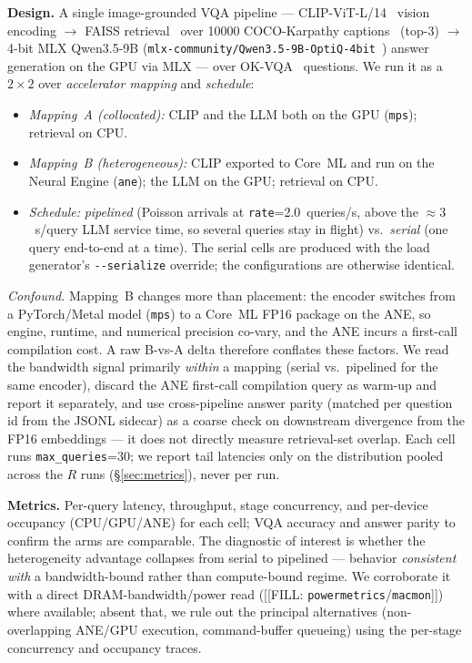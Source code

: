 \textbf{Design.} A single image-grounded VQA pipeline ---
CLIP-ViT-L/14~\cite{radford2021clip} vision encoding $\rightarrow$ FAISS
retrieval~\cite{johnson2019faiss} over \num{10000} COCO-Karpathy
captions~\cite{lin2014coco,karpathy2015deepvs} (top-3) $\rightarrow$ 4-bit MLX
Qwen3.5-9B (\texttt{mlx-community/Qwen3.5-9B-OptiQ-4bit}~\cite{qwen35}) answer
generation on the GPU via MLX --- over OK-VQA~\cite{marino2019okvqa} questions.
We run it as a $2\times2$ over \emph{accelerator mapping} and \emph{schedule}:
\begin{itemize}
  \item \emph{Mapping~A (collocated):} CLIP and the LLM both on the GPU
    (\texttt{mps}); retrieval on CPU.
  \item \emph{Mapping~B (heterogeneous):} CLIP exported to Core~ML and run on
    the Neural Engine (\texttt{ane}); the LLM on the GPU; retrieval on CPU.
  \item \emph{Schedule:} \emph{pipelined} (Poisson arrivals at
    \texttt{rate}=2.0~queries/s, above the ${\approx}3$~s/query LLM service
    time, so several queries stay in flight) vs.\ \emph{serial} (one query
    end-to-end at a time). The serial cells are produced with the load
    generator's \texttt{-{}-serialize} override; the configurations are
    otherwise identical.
\end{itemize}
\emph{Confound.} Mapping~B changes more than placement: the encoder switches
from a PyTorch/Metal model (\texttt{mps}) to a Core~ML FP16 package on the ANE,
so engine, runtime, and numerical precision co-vary, and the ANE incurs a
first-call compilation cost. A raw B-vs-A delta therefore conflates these
factors. We read the bandwidth signal primarily \emph{within} a mapping (serial
vs.\ pipelined for the same encoder), discard the ANE first-call compilation
query as warm-up and report it separately, and use cross-pipeline answer parity
(matched per question id from the JSONL sidecar) as a coarse check on downstream
divergence from the FP16 embeddings --- it does not directly measure
retrieval-set overlap. Each cell runs \texttt{max\_queries}=30; we report tail
latencies only on the distribution pooled across the $R$ runs
(\S\ref{sec:metrics}), never per run.

\textbf{Metrics.} Per-query latency, throughput, stage concurrency, and
per-device occupancy (CPU/GPU/ANE) for each cell; VQA accuracy and answer parity
to confirm the arms are comparable. The diagnostic of interest is whether the
heterogeneity advantage collapses from serial to pipelined --- behavior
\emph{consistent with} a bandwidth-bound rather than compute-bound regime. We
corroborate it with a direct DRAM-bandwidth/power read
([[FILL: \texttt{powermetrics}/\texttt{macmon}]]) where available; absent that,
we rule out the principal alternatives (non-overlapping ANE/GPU execution,
command-buffer queueing) using the per-stage concurrency and occupancy traces.

